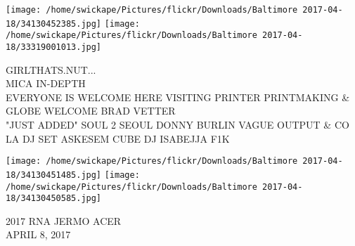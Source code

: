 \documentclass[10pt,letterpaper]{article}
\begin{document}
\texttt{[image: /home/swickape/Pictures/flickr/Downloads/Baltimore 2017-04-18/34130452385.jpg]}
\texttt{[image: /home/swickape/Pictures/flickr/Downloads/Baltimore 2017-04-18/33319001013.jpg]}

GIRLTHATS.NUT...\\
MICA IN{-}DEPTH\\
EVERYONE IS WELCOME HERE VISITING PRINTER PRINTMAKING \& GLOBE WELCOME BRAD VETTER\\
"JUST ADDED" SOUL 2 SEOUL DONNY BURLIN VAGUE OUTPUT \& CO LA DJ SET ASKESEM CUBE DJ ISABEJJA F1K\\
\pagebreak

\texttt{[image: /home/swickape/Pictures/flickr/Downloads/Baltimore 2017-04-18/34130451485.jpg]}
\texttt{[image: /home/swickape/Pictures/flickr/Downloads/Baltimore 2017-04-18/34130450585.jpg]}

2017 RNA JERMO ACER\\
APRIL 8, 2017\\
\pagebreak
\end{document}
